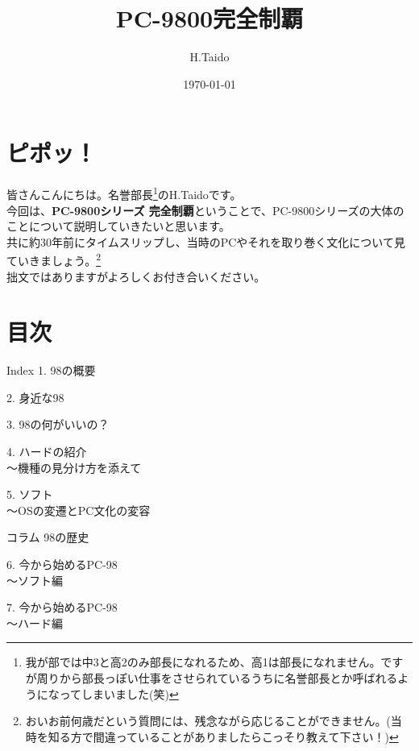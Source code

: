 \documentclass[b5paper,9pt,platex,dvipdfmx]{jsarticle}
\begin{document}
\title{PC-9800完全制覇}
\author{H.Taido}
\date{\today}
\maketitle
\thispagestyle{empty}

\begin{multicols*}{3}
  
\section*{ピポッ！}
皆さんこんにちは。名誉部長\footnote{我が部では中3と高2のみ部長になれるため、高1は部長になれません。ですが周りから部長っぽい仕事をさせられているうちに名誉部長とか呼ばれるようになってしまいました(笑)}のH.Taidoです。\\
今回は、{\bf PC-9800シリーズ 完全制覇}ということで、PC-9800シリーズの大体のことについて説明していきたいと思います。\\共に約30年前にタイムスリップし、当時のPCやそれを取り巻く文化について見ていきましょう。\footnote{おいお前何歳だという質問には、残念ながら応じることができません。(当時を知る方で間違っていることがありましたらこっそり教えて下さい！)}\\
拙文ではありますがよろしくお付き合いください。
\section*{目次}
\begin{itembox}[l]{Index}
  1. 98の概要

  2. 身近な98

  3. 98の何がいいの？

  4. ハードの紹介
  \\〜機種の見分け方を添えて

  5. ソフト
  \\〜OSの変遷とPC文化の変容

  コラム 98の歴史

  6. 今から始めるPC-98
  \\〜ソフト編

  7. 今から始めるPC-98
  \\〜ハード編


\end{itembox}
\end{multicols*}
\end{document}
